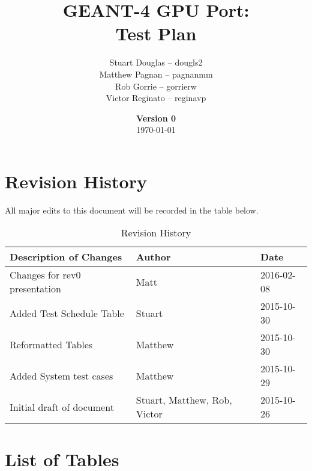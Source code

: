 \documentclass[12pt]{article}
\title{
\LARGE GEANT-4 GPU Port:
\\\vspace{10mm}
\large \textbf{Test Plan}
\vspace{40mm}
}
\author{
Stuart Douglas -- dougls2
\\Matthew Pagnan -- pagnanmm
\\Rob Gorrie -- gorrierw
\\Victor Reginato -- reginavp
\vspace{10mm}
}
\date{\vfill \textbf{Version 0}\\ \today}
\begin{document}

\maketitle
\newpage

\tableofcontents
\newpage
{}
\restoregeometry


\section*{Revision History}
All major edits to this document will be recorded in the table below.

\begin{table}[h]
\centering
\caption{Revision History}\label{Table_Revision}
\begin{tabular}{lll}

\toprule
\bf Description of Changes & \bf Author & \bf Date\\\midrule
Changes for rev0 presentation & Matt & 2016-02-08\\
Added Test Schedule Table & Stuart & 2015-10-30\\
Reformatted Tables & Matthew & 2015-10-30\\
Added System test cases & Matthew & 2015-10-29\\
Initial draft of document & Stuart, Matthew, Rob, Victor & 2015-10-26\\

\bottomrule
\end{tabular}
\end{table}

\section*{List of Tables}
\end{document}
